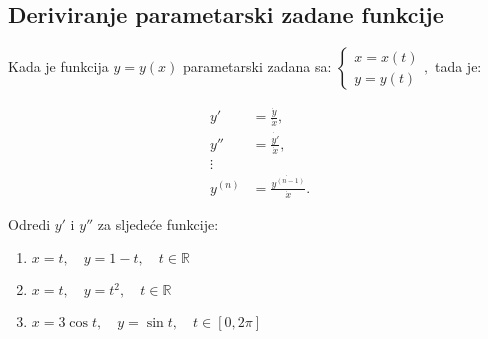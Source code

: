 \subsection{Deriviranje parametarski zadane funkcije}

Kada je funkcija $y=y(x)$ parametarski zadana sa: $\displaystyle
\begin{cases}
    x = x(t)\\
    y = y(t)
\end{cases},
$ tada je:

\begin{align*}
y'&=\frac{\dot{y}}{\dot{x}},\\
y''&=\frac{\dot{y'}}{\dot{x}},\\
\vdots&\\
y^{(n)}&=\frac{\dot{y^{(n-1)}}}{\dot{x}}.
\end{align*}

\begin{example}
    Odredi $y'$ i $y''$ za sljedeće funkcije:

    \begin{enumerate}
        \item $x=t,\quad y=1-t,\quad t\in\mathbb{R}$
        \item $x=t,\quad y=t^2,\quad t\in\mathbb{R}$
        \item $x=3\cos t,\quad y=\sin t,\quad t\in[0, 2\pi]$
    \end{enumerate}
\end{example}